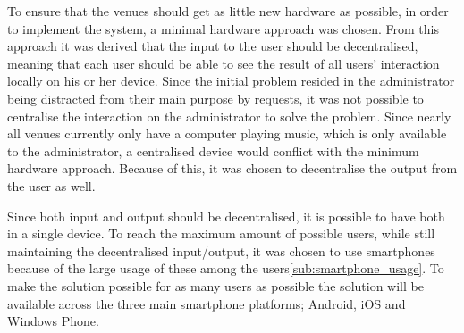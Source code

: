To ensure that the venues should get as little new hardware as possible, in order to implement the system, a minimal hardware approach was chosen.
From this approach it was derived that the input to the user should be decentralised, meaning that each user should be able to see the result of all users' interaction locally on his or her device.
Since the initial problem resided in the administrator being distracted from their main purpose by requests, it was not possible to centralise the interaction on the administrator to solve the problem. Since nearly all venues currently only have a computer playing music, which is only available to the administrator, a centralised device would conflict with the minimum hardware approach. Because of this, it was chosen to decentralise the output from the user as well.

Since both input and output should be decentralised, it is possible to have both in a single device.
To reach the maximum amount of possible users, while still maintaining the decentralised input/output, it was chosen to use smartphones because of the large usage of these among the users\cref{sub:smartphone_usage}. To make the solution possible for as many users as possible the solution will be available across the three main smartphone platforms; Android, iOS and Windows Phone.